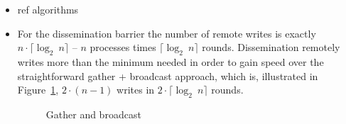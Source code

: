 \documentclass[a4paper, 10pt]{article}
\begin{document}
\begin{itemize}
	\item ref algorithms
	\item For the dissemination barrier the number of remote writes is exactly $n \cdot \lceil \log _2~n \rceil$ -- $n$ processes times $\lceil \log _2~n \rceil$ rounds. Dissemination remotely writes more than the minimum needed in order to gain speed over the straightforward gather + broadcast approach, which is, illustrated in Figure~\ref{fig:diagram-gather-broadcast}, $2 \cdot (n-1)$ writes in $2 \cdot  \lceil \log _2~n \rceil$ rounds.
		\begin{figure}[htbp]
			\centering
			
			\caption{Gather and broadcast}
			\label{fig:diagram-gather-broadcast}
		\end{figure}


\end{itemize}
\end{document}
